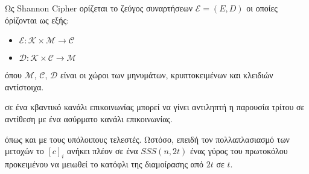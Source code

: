 
\begin{definition}
Ως Shannon Cipher ορίζεται το ζεύγος συναρτήσεων $\mathcal{E} = (E,D)$ οι οποίες όρίζονται ως εξής:
\begin{itemize}
    \item $\mathcal{E} : \mathcal{K} \times \mathcal{M} \rightarrow \mathcal{C}$
    \item $\mathcal{D} : \mathcal{K} \times \mathcal{C} \rightarrow \mathcal{M}$
\end{itemize}
όπου $\mathcal{M}$, $\mathcal{C}$, $\mathcal{D}$ είναι οι χώροι των μηνυμάτων, κρυπτοκειμένων και κλειδιών αντίστοιχα.
\end{definition}

 σε ένα κβαντικό κανάλι επικοινωνίας μπορεί να γίνει αντιληπτή η παρουσία τρίτου σε αντίθεση με ένα ασύρματο κανάλι επικοινωνίας.
 
 όπως και με τους υπόλοιπους τελεστές. Ωστόσο, επειδή τον πολλαπλασιασμό των μετοχών το $[c]_i$ ανήκει πλέον σε ένα $SSS(n, 2t)$  ένας γύρος του πρωτοκόλου προκειμένου να μειωθεί το κατόφλι της διαμοίρασης από $2t$ σε $t$. 
 



